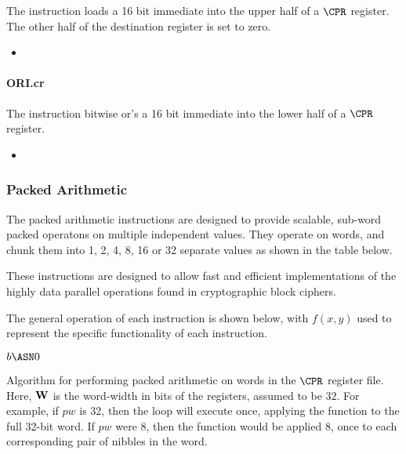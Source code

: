 The  instruction loads a 16 bit immediate into the
upper half of a $\CPR$ register. The other half of the
destination register is set to zero.

\begin{itemize}
\item {}
\end{itemize}

\paragraph{ORI.cr}

The  instruction bitwise or's a 16 bit immediate into the
lower half of a $\CPR$ register. 

\begin{itemize}
\item {}
\end{itemize}

\subsubsection{Packed Arithmetic}

The packed arithmetic instructions are designed to provide scalable, sub-word
packed operatons on multiple independent values. They operate on words, and
chunk them into 1, 2, 4, 8, 16 or 32 separate values as shown in the table
below.

These instructions are designed to allow fast and efficient implementations
of the highly data parallel operations found in cryptographic block ciphers.

The general operation of each instruction is shown below, with $f(x,y)$
used to represent the specific functionality of each instruction.

\medskip

\begin{algorithm}[H]
    $b   \ASN 0 $\;
\caption{Algorithm for performing packed arithmetic on words in the 
$\CPR$ register file. Here, ${\bf W}$ is the word-width in bits of the
registers, assumed to be $32$. For example, if $pw$ is 32, then the loop
will execute once, applying the function to the full 32-bit word. If $pw$
were $8$, then the function would be applied $8$, once to each corresponding
pair of nibbles in the word.}
\end{algorithm}

